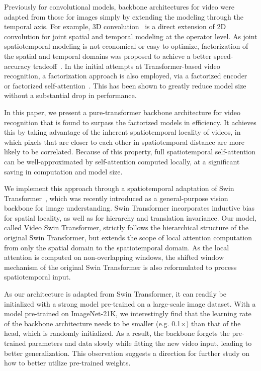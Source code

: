 \documentclass{article}
\begin{document}
Previously for convolutional models, backbone architectures for video were adapted from those for images simply by extending the modeling through the temporal axis. For example, 3D convolution~\cite{tran2015learning} is a direct extension of 2D convolution for joint spatial and temporal modeling at the operator level. As joint spatiotemporal modeling is not economical or easy to optimize, factorization of the spatial and temporal domains was proposed to achieve a better speed-accuracy tradeoff~\cite{qiu2017P3D,xie2018rethinking}. In the initial attempts at Transformer-based video recognition, a factorization approach is also employed, via a factorized encoder~\cite{arnab2021vivit} or factorized self-attention~\cite{arnab2021vivit, timesformer2021}. This has been shown to greatly reduce model size without a substantial drop in performance.

In this paper, we present a pure-transformer backbone architecture for video recognition that is found to surpass the factorized models in efficiency. It achieves this by taking advantage of the inherent spatiotemporal locality of videos, in which pixels that are closer to each other in spatiotemporal distance are more likely to be correlated. Because of this property, full spatiotemporal self-attention can be well-approximated by self-attention computed locally, at a significant saving in computation and model size. 

We implement this approach through a spatiotemporal adaptation of Swin Transformer~\cite{liu2021swin}, which was recently introduced as a general-purpose vision backbone for image understanding. Swin Transformer incorporates inductive bias for spatial locality, as well as for hierarchy and translation invariance. Our model, called Video Swin Transformer, strictly follows the hierarchical structure of the original Swin Transformer, but extends the scope of local attention computation from only the spatial domain to the spatiotemporal domain. As the local attention is computed on non-overlapping windows, the shifted window mechanism of the original Swin Transformer is also reformulated to process spatiotemporal input.

As our architecture is adapted from Swin Transformer, it can readily be initialized with a strong model pre-trained on a large-scale image dataset.
With a model pre-trained on ImageNet-21K, we interestingly find that the learning rate of the backbone architecture needs to be smaller (e.g. 0.1$\times$) than that of the head, which is randomly initialized. As a result, the backbone forgets the pre-trained parameters and data slowly while fitting the new video input, leading to better generalization. This observation suggests a direction for further study on how to better utilize pre-trained weights.
\end{document}
